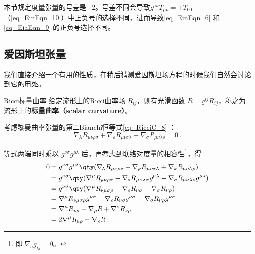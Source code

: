 

本节规定度量张量的号差是$-2$。号差不同会导致$g^{\mu\nu}T_{\mu\nu}=\pm T_{00}$（\autoref{eq_EinEqn_10}）中正负号的选择不同，进而导致\autoref{eq_EinEqn_6} 和\autoref{eq_EinEqn_9} 的正负号选择不同。

\subsection{爱因斯坦张量}

我们直接介绍一个有用的性质，在稍后猜测爱因斯坦场方程的时候我们自然会讨论到它的用处。

\begin{definition}{Ricci标量曲率}
给定流形上的Ricci曲率场 $R_{ij}$，则有光滑函数 $R=g^{ij}R_{ij}$，称之为流形上的\textbf{标量曲率（scalar curvature）}。
\end{definition}

考虑黎曼曲率张量的第二Bianchi恒等式\autoref{eq_RicciC_8} ：
\begin{equation}
\nabla_\lambda R_{\mu\nu\rho\sigma}+\nabla_\rho R_{\mu\nu\sigma\lambda}+\nabla_\sigma R_{\mu\nu\lambda\rho}=0~.
\end{equation}

等式两端同时乘以 $g^{\nu\sigma}g^{\mu\lambda}$ 后，再考虑到联络对度量的相容性\footnote{即 $\nabla_ag_{ij}=0$。}，得
\begin{equation}
\begin{aligned}
0&=g^{\nu\sigma}g^{\mu\lambda}\qty(\nabla_\lambda R_{\mu\nu\rho\sigma}+\nabla_\rho R_{\mu\nu\sigma\lambda}+\nabla_\sigma R_{\mu\nu\lambda\rho})\\
&=g^{\nu\sigma}\qty(\nabla^\mu R_{\mu\nu\rho\sigma} - \nabla_\rho R_{\mu\nu\lambda\sigma}g^{\mu\lambda} + \nabla_\sigma R_{\mu\nu\lambda\rho}g^{\mu\lambda})\\
&=g^{\nu\sigma}\qty(\nabla^\mu R_{\nu\mu\sigma\rho} - \nabla_\rho R_{\nu\sigma} + \nabla_\sigma R_{\nu\rho})\\
&=\nabla^\mu R_{\nu\mu\sigma\rho}g^{\nu\sigma} - \nabla_\rho R_{\nu\sigma}g^{\nu\sigma} + \nabla_\sigma R_{\nu\rho}g^{\nu\sigma}\\
&=\nabla^\mu R_{\mu\rho} - \nabla_\rho R + \nabla^\nu R_{\nu\rho}\\
&=2\nabla^\mu R_{\mu\rho} - \nabla_\rho R~.
\end{aligned}
\end{equation}

